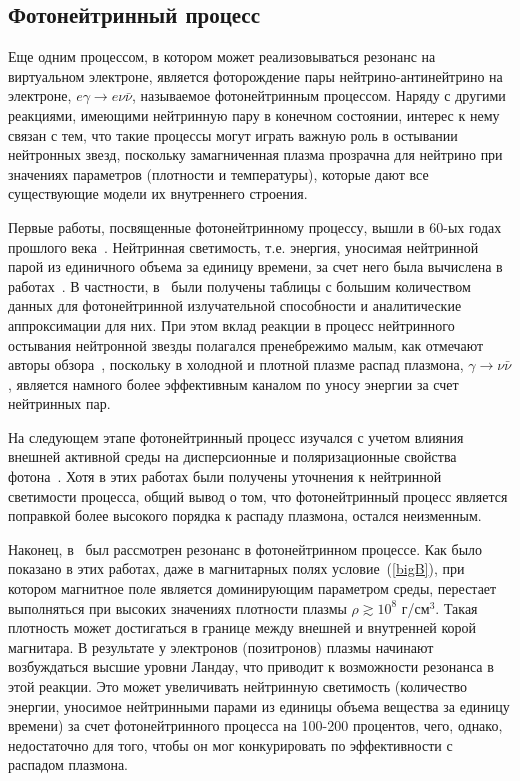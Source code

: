 \subsection{Фотонейтринный процесс}
Еще одним процессом, в котором может реализовываться резонанс на виртуальном электроне, является фоторождение пары нейтрино-антинейтрино на электроне, $e\gamma\to e\nu\bar\nu$, называемое фотонейтринным процессом. Наряду с другими реакциями, имеющими нейтринную пару в конечном состоянии, интерес к нему связан с тем, что такие процессы могут играть важную роль в остывании нейтронных звезд, поскольку замагниченная плазма прозрачна для нейтрино при значениях параметров (плотности и температуры), которые дают все существующие модели их внутреннего строения.

Первые работы, посвященные фотонейтринному процессу, вышли в 60-ых годах прошлого века~\cite{Ritus:1961,Chiu:1961}. Нейтринная светимость, т.е. энергия, уносимая нейтринной парой из единичного объема за единицу времени, за счет него была вычислена в работах~\cite{Beaudet:1967,Dicus:1972,Munakata:1985,Shindler:1987,Itoh:1989,Itoh:1996,Skobelev:2000}. В частности, в~\cite{Itoh:1989,Itoh:1996} были получены таблицы с большим количеством данных для фотонейтринной излучательной способности и аналитические аппроксимации для них. При этом вклад реакции в процесс нейтринного остывания нейтронной звезды полагался пренебрежимо малым, как отмечают авторы обзора~\cite{Yakovlev2001}, поскольку в холодной и плотной плазме распад плазмона, $\gamma\to\nu\bar\nu$, является намного более эффективным каналом по уносу энергии за счет нейтринных пар.

На следующем этапе фотонейтринный процесс изучался с учетом влияния внешней активной среды на дисперсионные и поляризационные свойства фотона~\cite{RCh:2008,Borisov:2012,RumChMik}. Хотя в этих работах были получены уточнения к нейтринной светимости процесса, общий вывод о том, что фотонейтринный процесс является поправкой более высокого порядка к распаду плазмона, остался неизменным.

Наконец, в~\cite{Chistyakov:2014cga,qfthep2017} был рассмотрен резонанс в фотонейтринном процессе. Как было показано в этих работах, даже в магнитарных полях условие~(\ref{bigB}), при котором магнитное поле является доминирующим параметром среды, перестает выполняться при высоких значениях плотности плазмы $\rho \gtrsim 10^8$ г/см$^3$. Такая плотность может достигаться в границе между внешней и внутренней корой магнитара. В результате у электронов (позитронов) плазмы начинают возбуждаться высшие уровни Ландау, что приводит к возможности резонанса в этой реакции. 
Это может увеличивать нейтринную светимость (количество энергии, уносимое нейтринными парами из единицы объема вещества за единицу времени) за счет фотонейтринного процесса на 100-200 процентов, чего, однако, недостаточно для того, чтобы он мог конкурировать по эффективности с распадом плазмона.